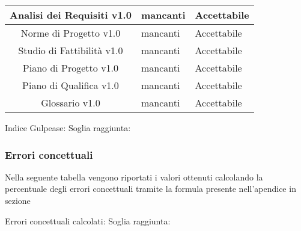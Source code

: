 {
	\renewcommand{\arraystretch}{2}
	\centering
	\begin{tabular}{| c | C{3cm} | C{3cm} |}
			\hline
		Analisi dei Requisiti v1.0 &  mancanti & Accettabile \\
			\hline
		Norme di Progetto v1.0 & mancanti & Accettabile\\
			\hline
		Studio di Fattibilità v1.0 & mancanti & Accettabile\\ 
			\hline
		Piano di Progetto v1.0 & mancanti & Accettabile \\
			\hline
		Piano di Qualifica v1.0 & mancanti & Accettabile\\
			\hline
		Glossario v1.0 & mancanti & Accettabile\\
			\hline
	 \end{tabular}
 
}

Indice Gulpease:
Soglia raggiunta:

\subsubsection{Errori concettuali}

Nella seguente tabella vengono riportati i valori ottenuti calcolando la percentuale degli errori concettuali tramite la formula presente nell'apendice in sezione ~


Errori concettuali calcolati:
Soglia raggiunta:
